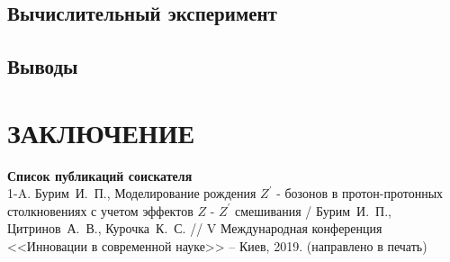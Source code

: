 \documentclass[12pt,a4paper]{styles/report}
\begin{document}
\section{Вычислительный эксперимент}

\section{Выводы}


\newpage
\chapter*{ЗАКЛЮЧЕНИЕ}


\newpage
{}
\begin{thebibliography}{9999.}

\end{thebibliography}

\textbf{Список публикаций соискателя}\\

1-A. Бурим~И.~П., Моделирование рождения $Z^\prime$ - бозонов в протон-протонных столкновениях с учетом эффектов $Z$ - $Z^\prime$ смешивания / Бурим~И.~П., Цитринов~А.~В., Курочка~К.~С. // V Международная конференция <<Инновации в современной науке>> -- Киев, 2019. (направлено в печать)


\newpage

\end{document}
